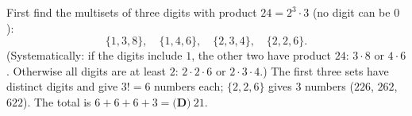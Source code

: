 First find the multisets of three digits with product $24=2^3\cdot3$ (no digit can be $0$):
\[
\{1,3,8\},\quad \{1,4,6\},\quad \{2,3,4\},\quad \{2,2,6\}.
\]
(Systematically: if the digits include $1$, the other two have product $24$: $3\cdot8$ or $4\cdot6$. Otherwise all digits are at least $2$: $2\cdot2\cdot6$ or $2\cdot3\cdot4$.) The first three sets have distinct digits and give $3!=6$ numbers each; $\{2,2,6\}$ gives $3$ numbers ($226$, $262$, $622$). The total is $6+6+6+3=\boxed{\textbf{(D)}\ 21}$.
